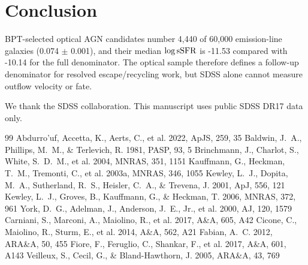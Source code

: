 \documentclass[twocolumn]{aastex631}
\begin{document}
\section{Conclusion}\label{sec:conclusion}
BPT-selected optical AGN candidates number 4,440 of 60,000 emission-line galaxies (0.074 $\pm$ 0.001), and their median $\log {\rm sSFR}$ is -11.53 compared with -10.14 for the full denominator. The optical sample therefore defines a follow-up denominator for resolved escape/recycling work, but SDSS alone cannot measure outflow velocity or fate.

\begin{acknowledgments}
We thank the SDSS collaboration. This manuscript uses public SDSS DR17 data only.
\end{acknowledgments}


\begin{thebibliography}{99}
 Abdurro'uf, Accetta, K., Aerts, C., et al. 2022, ApJS, 259, 35
 Baldwin, J.~A., Phillips, M.~M., \& Terlevich, R. 1981, PASP, 93, 5
 Brinchmann, J., Charlot, S., White, S.~D.~M., et al. 2004, MNRAS, 351, 1151
 Kauffmann, G., Heckman, T.~M., Tremonti, C., et al. 2003a, MNRAS, 346, 1055
 Kewley, L.~J., Dopita, M.~A., Sutherland, R.~S., Heisler, C.~A., \& Trevena, J. 2001, ApJ, 556, 121
 Kewley, L.~J., Groves, B., Kauffmann, G., \& Heckman, T. 2006, MNRAS, 372, 961
 York, D.~G., Adelman, J., Anderson, J.~E., Jr., et al. 2000, AJ, 120, 1579
 Carniani, S., Marconi, A., Maiolino, R., et al. 2017, A\&A, 605, A42
 Cicone, C., Maiolino, R., Sturm, E., et al. 2014, A\&A, 562, A21
 Fabian, A.~C. 2012, ARA\&A, 50, 455
 Fiore, F., Feruglio, C., Shankar, F., et al. 2017, A\&A, 601, A143
 Veilleux, S., Cecil, G., \& Bland-Hawthorn, J. 2005, ARA\&A, 43, 769
\end{thebibliography}
\end{document}
